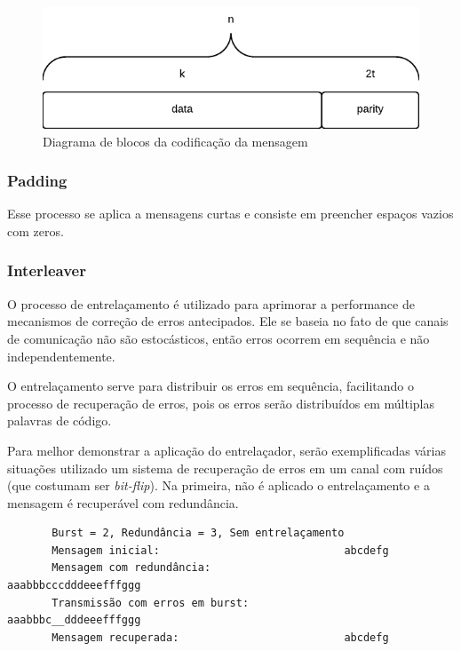 	\begin{figure}[htb]
		\caption{\label{fig_reed_solomon_message} Diagrama de blocos da codificação da mensagem}
		\centering
		\includegraphics[width=0.5\textheight]{reed_solomon_message.pdf}
	\end{figure}	
	
	\subsubsection{Padding}
	
	Esse processo se aplica a mensagens curtas e consiste em preencher espaços vazios com zeros.
	
	\subsubsection{Interleaver}
	
	O processo de entrelaçamento é utilizado para aprimorar a performance de mecanismos de correção de erros antecipados. Ele se baseia no fato de que canais de comunicação não são estocásticos, então erros ocorrem em sequência e não independentemente. 
	
	O entrelaçamento serve para distribuir os erros em sequência, facilitando o processo de recuperação de erros, pois os erros serão distribuídos em múltiplas palavras de código. 
	
	Para melhor demonstrar a aplicação do entrelaçador, serão exemplificadas várias situações utilizado um sistema de recuperação de erros em um canal com ruídos (que costumam ser \textit{bit-flip}). Na primeira, não é aplicado o entrelaçamento e a mensagem é recuperável com redundância.

	\begin{verbatim}
	   Burst = 2, Redundância = 3, Sem entrelaçamento
	   Mensagem inicial:                             abcdefg
	   Mensagem com redundância:                     aaabbbcccdddeeefffggg
	   Transmissão com erros em burst:               aaabbbc__dddeeefffggg
	   Mensagem recuperada:                          abcdefg
	\end{verbatim}

